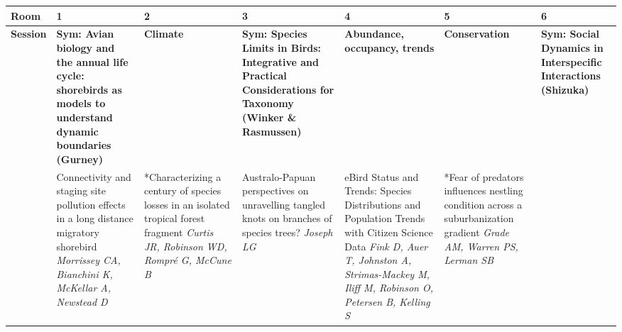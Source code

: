 \begin{tabular}{|x{0.75cm}|a{2.25cm}|x{2.25cm}|a{2.25cm}|x{2.25cm}|x{2.25cm}|a{2.25cm}|}\hline
Room & 1 & 2 & 3 & 4 & 5 & 6\\
\hline
\rule{0pt}{1em} \textbf{Session} &\footnotesize \textbf{Sym: Avian biology and the annual life cycle: shorebirds as models to understand dynamic boundaries (Gurney)} & \footnotesize \textbf{Climate} & \footnotesize \textbf{Sym: Species Limits in Birds: Integrative and Practical Considerations for Taxonomy (Winker \& Rasmussen)} & \footnotesize \textbf{Abundance, occupancy, trends} & \footnotesize \textbf{Conservation} & \footnotesize \textbf{Sym: Social Dynamics in Interspecific Interactions (Shizuka)}\\
\hline
{}&Connectivity and staging site pollution effects in a long distance migratory shorebird \newline \newline \textit{Morrissey CA, Bianchini K, McKellar A, Newstead D} & *Characterizing a century of species losses in an isolated tropical forest fragment \newline \newline \textit{Curtis JR, Robinson WD, Rompr\'{e} G, McCune B} & Australo-Papuan perspectives on unravelling tangled knots on branches of species trees? \newline \newline \textit{Joseph LG} & eBird Status and Trends: Species Distributions and Population Trends with Citizen Science Data \newline \newline \textit{Fink D, Auer T, Johnston A, Strimas-Mackey M, Iliff M, Robinson O, Petersen B, Kelling S} & *Fear of predators influences nestling condition across a suburbanization gradient \newline \newline \textit{Grade AM, Warren PS, Lerman SB} &  \newline \newline \textit{}\\
\hline

\end{tabular}
